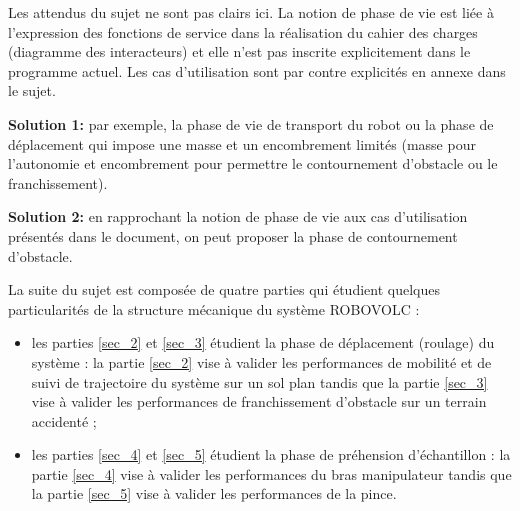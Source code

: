 \fi

\ifprof
\begin{corrige}
Les attendus du sujet ne sont pas clairs ici. La notion de phase de vie est liée à l’expression des fonctions de service dans la réalisation du cahier des charges (diagramme des interacteurs) et elle n’est pas inscrite explicitement dans le programme actuel. Les cas d’utilisation sont par contre explicités en annexe dans le sujet.

\textbf{Solution 1:} par exemple, la phase de vie de transport du robot ou la phase de déplacement qui impose une masse et un encombrement limités (masse pour l’autonomie et encombrement pour permettre le contournement d’obstacle ou le franchissement).

\textbf{Solution 2:}  en rapprochant la notion de phase de vie aux cas d’utilisation présentés dans le document, on peut proposer la phase de contournement d’obstacle.

\end{corrige}
\else
\fi

\ifprof
\else
La suite du sujet est composée de quatre parties qui étudient quelques particularités de la
structure mécanique du système ROBOVOLC :
\begin{itemize}
\item les parties \ref{sec_2} et \ref{sec_3} étudient la phase de déplacement (roulage) du système : la partie \ref{sec_2} vise
à valider les performances de mobilité et de suivi de trajectoire du système sur un sol plan
tandis que la partie \ref{sec_3} vise à valider les performances de franchissement d'obstacle sur un
terrain accidenté ;
\item les parties \ref{sec_4} et \ref{sec_5} étudient la phase de préhension d'échantillon : la partie \ref{sec_4} vise à valider
les performances du bras manipulateur tandis que la partie \ref{sec_5} vise à valider les
performances de la pince.
\end{itemize}
\fi

